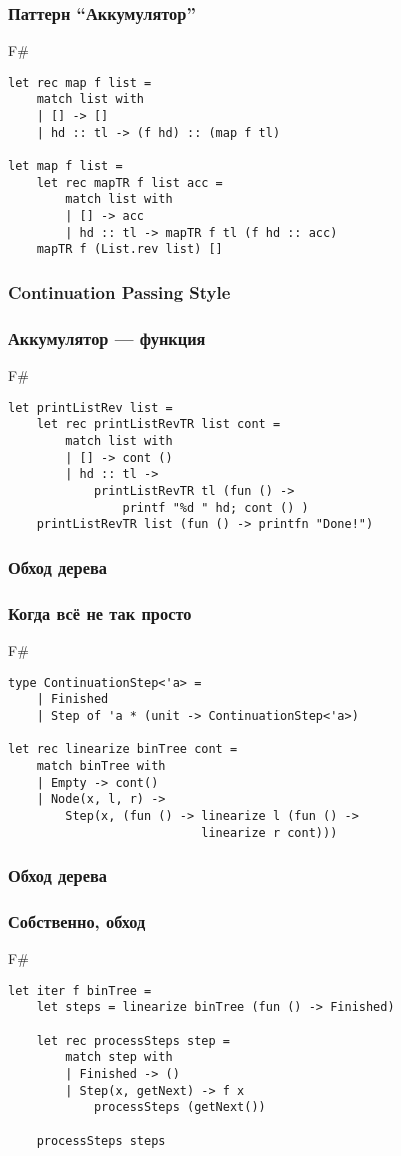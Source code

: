 \documentclass[xetex,mathserif,serif]{beamer}
\begin{document}
	\begin{frame}[fragile]
		\frametitle{Паттерн ``Аккумулятор''}
		\begin{exampleblock}{F\#}
			\begin{verbatim}
let rec map f list =
    match list with
    | [] -> []
    | hd :: tl -> (f hd) :: (map f tl)

let map f list =
    let rec mapTR f list acc =
        match list with
        | [] -> acc
        | hd :: tl -> mapTR f tl (f hd :: acc)
    mapTR f (List.rev list) []
			\end{verbatim}
		\end{exampleblock}
\end{frame}

	\begin{frame}[fragile]
		\frametitle{Continuation Passing Style}
		\frametitle{Аккумулятор --- функция}
		\begin{exampleblock}{F\#}
			\begin{verbatim}
let printListRev list =
    let rec printListRevTR list cont =
        match list with
        | [] -> cont ()
        | hd :: tl ->
            printListRevTR tl (fun () -> 
                printf "%d " hd; cont () )
    printListRevTR list (fun () -> printfn "Done!")
			\end{verbatim}
		\end{exampleblock}
\end{frame}

	\begin{frame}[fragile]
		\frametitle{Обход дерева}
		\frametitle{Когда всё не так просто}
		\begin{exampleblock}{F\#}
			\begin{verbatim}
type ContinuationStep<'a> =
    | Finished
    | Step of 'a * (unit -> ContinuationStep<'a>)

let rec linearize binTree cont =
    match binTree with
    | Empty -> cont()
    | Node(x, l, r) ->
        Step(x, (fun () -> linearize l (fun () -> 
                           linearize r cont)))
			\end{verbatim}
		\end{exampleblock}
\end{frame}

	\begin{frame}[fragile]
		\frametitle{Обход дерева}
		\frametitle{Собственно, обход}
		\begin{exampleblock}{F\#}
			\begin{verbatim}
let iter f binTree =
    let steps = linearize binTree (fun () -> Finished)

    let rec processSteps step =
        match step with
        | Finished -> ()
        | Step(x, getNext) -> f x
            processSteps (getNext())
    
    processSteps steps
			\end{verbatim}
		\end{exampleblock}
\end{frame}
\end{document}
